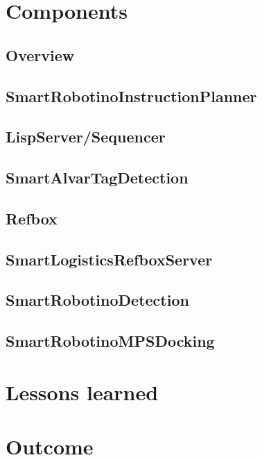 \documentclass[12pt]{report}
\begin{document}
\chapter{Components}
	\label{ch:components}

\section{Overview}
	

\section{SmartRobotinoInstructionPlanner}
	
	\label{ch:SmartRobotinoInstructionPlanner}

\section{LispServer/Sequencer}
	

\section{SmartAlvarTagDetection}
	

\section{Refbox}


\section{SmartLogisticsRefboxServer}
	


\section{SmartRobotinoDetection}
	

\section{SmartRobotinoMPSDocking}
	

\chapter{Lessons learned}
    

\chapter{Outcome}
    


\printbibliography
\end{document}
